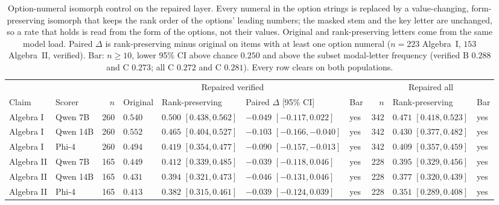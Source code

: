 \begin{table}[t]
  \caption{Option-numeral isomorph control on the repaired layer. Every numeral in the option strings is replaced by a value-changing, form-preserving isomorph that keeps the rank order of the options' leading numbers; the masked stem and the key letter are unchanged, so a rate that holds is read from the form of the options, not their values. Original and rank-preserving letters come from the same model load. Paired $\Delta$ is rank-preserving minus original on items with at least one option numeral ($n=223$ Algebra~I, $153$ Algebra~II, verified). Bar: $n\ge 10$, lower 95\% CI above chance $0.250$ and above the subset modal-letter frequency (verified B $0.288$ and C $0.273$; all C $0.272$ and C $0.281$). Every row clears on both populations.}
  \label{tab:isomorph}
  \centering
  \scriptsize
  \begin{tabular}{l l r l l l l r l l}
    \toprule
    & & \multicolumn{5}{c}{Repaired verified} & \multicolumn{3}{c}{Repaired all} \\
    Claim & Scorer & $n$ & Original & Rank-preserving & Paired $\Delta$ [95\% CI] & Bar & $n$ & Rank-preserving & Bar \\
    \midrule
    Algebra I & Qwen 7B & 260 & $0.540$ & $0.500$ $[0.438, 0.562]$ & $-0.049$ $[-0.117, 0.022]$ & yes & 342 & $0.471$ $[0.418, 0.523]$ & yes \\
    Algebra I & Qwen 14B & 260 & $0.552$ & $0.465$ $[0.404, 0.527]$ & $-0.103$ $[-0.166, -0.040]$ & yes & 342 & $0.430$ $[0.377, 0.482]$ & yes \\
    Algebra I & Phi-4 & 260 & $0.494$ & $0.419$ $[0.354, 0.477]$ & $-0.090$ $[-0.157, -0.013]$ & yes & 342 & $0.409$ $[0.357, 0.459]$ & yes \\
    Algebra II & Qwen 7B & 165 & $0.449$ & $0.412$ $[0.339, 0.485]$ & $-0.039$ $[-0.118, 0.046]$ & yes & 228 & $0.395$ $[0.329, 0.456]$ & yes \\
    Algebra II & Qwen 14B & 165 & $0.431$ & $0.394$ $[0.321, 0.473]$ & $-0.046$ $[-0.131, 0.046]$ & yes & 228 & $0.377$ $[0.320, 0.439]$ & yes \\
    Algebra II & Phi-4 & 165 & $0.413$ & $0.382$ $[0.315, 0.461]$ & $-0.039$ $[-0.124, 0.039]$ & yes & 228 & $0.351$ $[0.289, 0.408]$ & yes \\
    \bottomrule
  \end{tabular}
\end{table}

